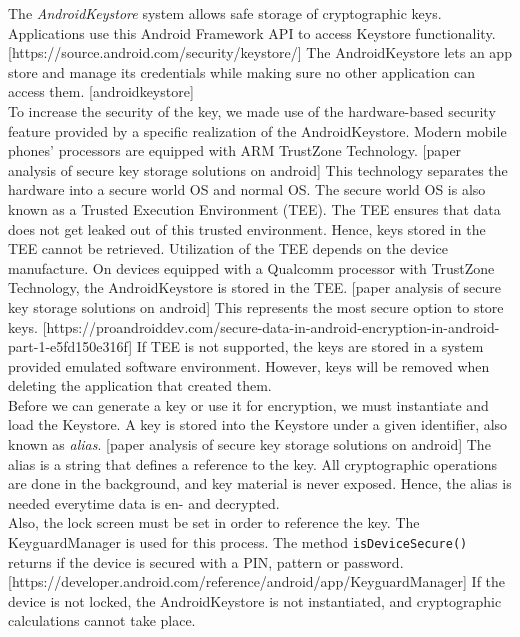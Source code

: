 The \textit{AndroidKeystore} system allows safe storage of cryptographic keys. Applications use this Android Framework API  to access Keystore functionality. [https://source.android.com/security/keystore/] The AndroidKeystore lets an app store and manage its credentials while making sure no other application can access them. [androidkeystore] \\

To increase the security of the key, we made use of the hardware-based security feature provided by a specific realization of the AndroidKeystore. Modern mobile phones' processors are equipped with ARM TrustZone Technology. [paper analysis of secure key storage solutions on android] This technology separates the hardware into a secure world OS and normal OS. The secure world OS is also known as a Trusted Execution Environment (TEE). The TEE ensures that data does not get leaked out of this trusted environment. Hence, keys stored in the TEE cannot be retrieved. Utilization of the TEE depends on the device manufacture. On devices equipped with a Qualcomm processor with TrustZone Technology, the AndroidKeystore is stored in the TEE. [paper analysis of secure key storage solutions on android] This represents the most secure option to store keys. [https://proandroiddev.com/secure-data-in-android-encryption-in-android-part-1-e5fd150e316f] If TEE is not supported, the keys are stored in a system provided emulated software environment. However, keys will be removed when deleting the application that created them. \\

Before we can generate a key or use it for encryption, we must instantiate and load the Keystore.
A key is stored into the Keystore under a given identifier, also known as \textit{alias}. [paper analysis of secure key storage solutions on android] The alias is a string that defines a reference to the key. All cryptographic operations are done in the background, and key material is never exposed. Hence, the alias is needed everytime data is en- and decrypted. \\

Also, the lock screen must be set in order to reference the key. The KeyguardManager is used for this process. The method \texttt{isDeviceSecure()} returns if the device is secured with a PIN, pattern or password.[https://developer.android.com/reference/android/app/KeyguardManager]
If the device is not locked, the AndroidKeystore is not instantiated, and cryptographic calculations cannot take place. \\




